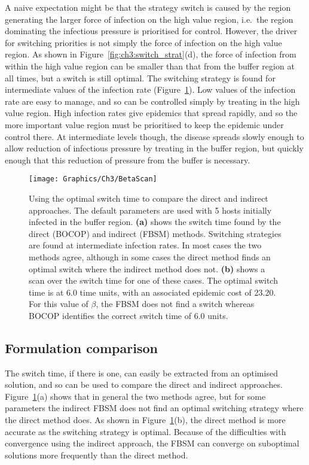 A naive expectation might be that the strategy switch is caused by the region generating the larger force of infection on the high value region, i.e.\ the region dominating the infectious pressure is prioritised for control. However, the driver for switching priorities is not simply the force of infection on the high value region. As shown in Figure~\ref{fig:ch3:switch_strat}(d), the force of infection from within the high value region can be smaller than that from the buffer region at all times, but a switch is still optimal. The switching strategy is found for intermediate values of the infection rate (Figure~\ref{fig:ch3:beta_scan}). Low values of the infection rate are easy to manage, and so can be controlled simply by treating in the high value region. High infection rates give epidemics that spread rapidly, and so the more important value region must be prioritised to keep the epidemic under control there. At intermediate levels though, the disease spreads slowly enough to allow reduction of infectious pressure by treating in the buffer region, but quickly enough that this reduction of pressure from the buffer is necessary.

\begin{figure}[H]
    \begin{center}
        \texttt{[image: Graphics/Ch3/BetaScan]}
        \caption[Comparing numerical methods using the switching strategy]{Using the optimal switch time to compare the direct and indirect approaches. The default parameters are used with 5 hosts initially infected in the buffer region. \textbf{(a)} shows the switch time found by the direct (BOCOP) and indirect (FBSM) methods. Switching strategies are found at intermediate infection rates. In most cases the two methods agree, although in some cases the direct method finds an optimal switch where the indirect method does not. \textbf{(b)} shows a scan over the switch time for one of these cases. The optimal switch time is at 6.0 time units, with an associated epidemic cost of 23.20. For this value of $\beta$, the FBSM does not find a switch whereas BOCOP identifies the correct switch time of 6.0 units.\label{fig:ch3:beta_scan}}
    \end{center}
\end{figure}

\subsection{Formulation comparison}

The switch time, if there is one, can easily be extracted from an optimised solution, and so can be used to compare the direct and indirect approaches. Figure~\ref{fig:ch3:beta_scan}(a) shows that in general the two methods agree, but for some parameters the indirect FBSM does not find an optimal switching strategy where the direct method does. As shown in Figure~\ref{fig:ch3:beta_scan}(b), the direct method is more accurate as the switching strategy is optimal. Because of the difficulties with convergence using the indirect approach, the FBSM can converge on suboptimal solutions more frequently than the direct method.

